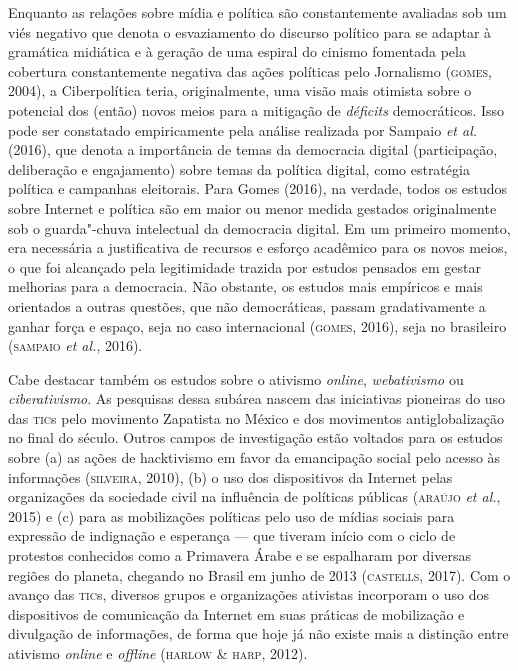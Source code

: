 Enquanto as relações sobre mídia e política são constantemente avaliadas
sob um viés negativo que denota o esvaziamento do discurso político para
se adaptar à gramática midiática e à geração de uma espiral do cinismo
fomentada pela cobertura constantemente negativa das ações políticas
pelo Jornalismo (\textsc{gomes}, 2004), a Ciberpolítica teria, originalmente, uma
visão mais otimista sobre o potencial dos (então) novos meios para a
mitigação de \emph{déficits} democráticos. Isso pode ser constatado
empiricamente pela análise realizada por Sampaio \emph{et al.} (2016),
que denota a importância de temas da democracia digital (participação,
deliberação e engajamento) sobre temas da política digital, como
estratégia política e campanhas eleitorais. Para Gomes (2016), na
verdade, todos os estudos sobre Internet e política são em maior ou
menor medida gestados originalmente sob o guarda"-chuva intelectual da
democracia digital. Em um primeiro momento, era necessária a
justificativa de recursos e esforço acadêmico para os novos meios, o que
foi alcançado pela legitimidade trazida por estudos pensados em gestar
melhorias para a democracia. Não obstante, os estudos mais empíricos e
mais orientados a outras questões, que não democráticas, passam
gradativamente a ganhar força e espaço, seja no caso internacional
(\textsc{gomes}, 2016), seja no brasileiro (\textsc{sampaio} \emph{et al.}, 2016).

Cabe destacar também os estudos sobre o ativismo \emph{online},
\emph{webativismo} ou \emph{ciberativismo}. As pesquisas dessa subárea
nascem das iniciativas pioneiras do uso das \textsc{tic}s pelo movimento
Zapatista no México e dos movimentos antiglobalização no final do
século. Outros campos de investigação estão voltados para os estudos
sobre (a) as ações de hacktivismo em favor da emancipação social pelo
acesso às informações (\textsc{silveira}, 2010), (b) o uso dos dispositivos da
Internet pelas organizações da sociedade civil na influência de
políticas públicas (\textsc{araújo} \emph{et al.}, 2015) e (c) para as
mobilizações políticas pelo uso de mídias sociais para expressão de
indignação e esperança --- que tiveram início com o ciclo de protestos
conhecidos como a Primavera Árabe e se espalharam por diversas regiões
do planeta, chegando no Brasil em junho de 2013 (\textsc{castells}, 2017). Com o
avanço das \textsc{tic}s, diversos grupos e organizações ativistas incorporam o
uso dos dispositivos de comunicação da Internet em suas práticas de
mobilização e divulgação de informações, de forma que hoje já não existe
mais a distinção entre ativismo \emph{online} e \emph{offline} (\textsc{harlow
\& harp}, 2012).

